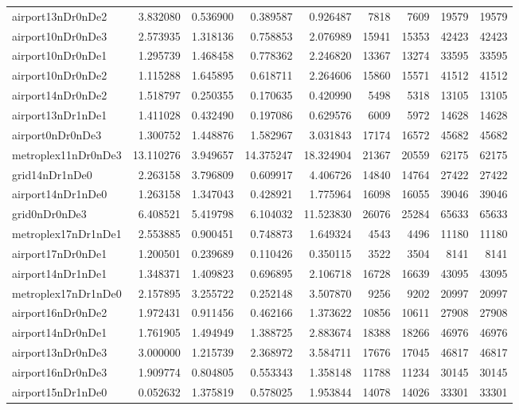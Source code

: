\begin{longtable}{|l|r|r|r|r|r|r|r|r|}
airport13nDr0nDe2 & 3.832080 & 0.536900 & 0.389587 & 0.926487 & 7818 & 7609 & 19579 & 19579 \\
airport10nDr0nDe3 & 2.573935 & 1.318136 & 0.758853 & 2.076989 & 15941 & 15353 & 42423 & 42423 \\
airport10nDr0nDe1 & 1.295739 & 1.468458 & 0.778362 & 2.246820 & 13367 & 13274 & 33595 & 33595 \\
airport10nDr0nDe2 & 1.115288 & 1.645895 & 0.618711 & 2.264606 & 15860 & 15571 & 41512 & 41512 \\
airport14nDr0nDe2 & 1.518797 & 0.250355 & 0.170635 & 0.420990 & 5498 & 5318 & 13105 & 13105 \\
airport13nDr1nDe1 & 1.411028 & 0.432490 & 0.197086 & 0.629576 & 6009 & 5972 & 14628 & 14628 \\
airport0nDr0nDe3 & 1.300752 & 1.448876 & 1.582967 & 3.031843 & 17174 & 16572 & 45682 & 45682 \\
metroplex11nDr0nDe3 & 13.110276 & 3.949657 & 14.375247 & 18.324904 & 21367 & 20559 & 62175 & 62175 \\
grid14nDr1nDe0 & 2.263158 & 3.796809 & 0.609917 & 4.406726 & 14840 & 14764 & 27422 & 27422 \\
airport14nDr1nDe0 & 1.263158 & 1.347043 & 0.428921 & 1.775964 & 16098 & 16055 & 39046 & 39046 \\
grid0nDr0nDe3 & 6.408521 & 5.419798 & 6.104032 & 11.523830 & 26076 & 25284 & 65633 & 65633 \\
metroplex17nDr1nDe1 & 2.553885 & 0.900451 & 0.748873 & 1.649324 & 4543 & 4496 & 11180 & 11180 \\
airport17nDr0nDe1 & 1.200501 & 0.239689 & 0.110426 & 0.350115 & 3522 & 3504 & 8141 & 8141 \\
airport14nDr1nDe1 & 1.348371 & 1.409823 & 0.696895 & 2.106718 & 16728 & 16639 & 43095 & 43095 \\
metroplex17nDr1nDe0 & 2.157895 & 3.255722 & 0.252148 & 3.507870 & 9256 & 9202 & 20997 & 20997 \\
airport16nDr0nDe2 & 1.972431 & 0.911456 & 0.462166 & 1.373622 & 10856 & 10611 & 27908 & 27908 \\
airport14nDr0nDe1 & 1.761905 & 1.494949 & 1.388725 & 2.883674 & 18388 & 18266 & 46976 & 46976 \\
airport13nDr0nDe3 & 3.000000 & 1.215739 & 2.368972 & 3.584711 & 17676 & 17045 & 46817 & 46817 \\
airport16nDr0nDe3 & 1.909774 & 0.804805 & 0.553343 & 1.358148 & 11788 & 11234 & 30145 & 30145 \\
airport15nDr1nDe0 & 0.052632 & 1.375819 & 0.578025 & 1.953844 & 14078 & 14026 & 33301 & 33301 \\

\end{longtable}
